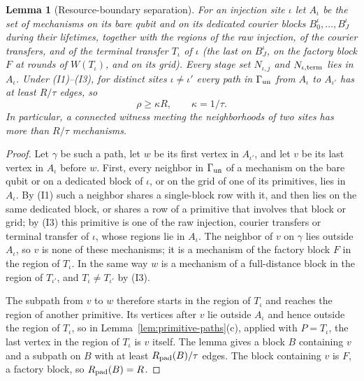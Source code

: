 \documentclass[aps,prx,reprint,superscriptaddress,nofootinbib,floatfix,longbibliography]{revtex4-2}
\newtheorem{lemma}[theorem]{Lemma}
\theoremstyle{definition}
\begin{document}
\begin{lemma}[Resource-boundary separation]\label{lem:resource-separation}
For an injection site $\iota$ let $A_\iota$ be the set of mechanisms on its
bare qubit and on its dedicated courier blocks $B^\iota_0,\dots,B^\iota_J$
during their lifetimes, together with the regions of the raw injection, of the
courier transfers, and of the terminal transfer $T_\iota$ of $\iota$ (the last
on $B^\iota_J$, on the factory block $F$ at rounds of $W(T_\iota)$, and on its
grid).  Every stage set $N_{\iota,j}$ and $N_{\iota,{\rm term}}$ lies in
$A_\iota$.  Under (I1)--(I3), for distinct sites $\iota\neq\iota'$ every path
in $\Gamma_{\rm un}$ from $A_\iota$ to $A_{\iota'}$ has at least $R/\tau$
edges, so
\begin{equation}
 \rho\geq \kappa R,\qquad \kappa=1/\tau.                           \tag{A15i}
\end{equation}
In particular, a connected witness meeting the neighborhoods of two sites has
more than $R/\tau$ mechanisms.
\end{lemma}
\begin{proof}
Let $\gamma$ be such a path, let $w$ be its first vertex in $A_{\iota'}$, and
let $v$ be its last vertex in $A_\iota$ before $w$.  First, every neighbor in
$\Gamma_{\rm un}$ of a mechanism on the bare qubit or on a dedicated block of
$\iota$, or on the grid of one of its primitives, lies in $A_\iota$.  By (I1)
such a neighbor shares a single-block row with it, and then lies on the same
dedicated block, or shares a row of a primitive that involves that block or
grid; by (I3) this primitive is one of the raw injection, courier transfers or
terminal transfer of $\iota$, whose regions lie in $A_\iota$.  The neighbor of
$v$ on $\gamma$ lies outside $A_\iota$, so $v$ is none of these mechanisms;
it is a mechanism of the factory block $F$ in the region of $T_\iota$.  In
the same way $w$ is a mechanism of a full-distance block in the region of
$T_{\iota'}$, and $T_\iota\neq T_{\iota'}$ by (I3).

The subpath from $v$ to $w$ therefore starts in the region of $T_\iota$ and
reaches the region of another primitive.  Its vertices after $v$ lie outside
$A_\iota$ and hence outside the region of $T_\iota$, so in
Lemma~\ref{lem:primitive-paths}(c), applied with $P=T_\iota$, the last
vertex in the region of $T_\iota$ is $v$ itself.  The lemma gives a block $B$
containing $v$ and a subpath on $B$ with at least $R_{\rm pad}(B)/\tau$
edges.  The block containing $v$ is $F$, a factory block, so
$R_{\rm pad}(B)=R$.
\end{proof}
\end{document}
